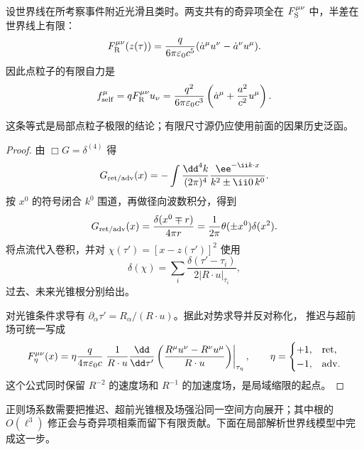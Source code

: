 \begin{proposition}[世界线上的正则场与有限自力]
设世界线在所考察事件附近光滑且类时。两支共有的奇异项全在 \(F_{\rm S}^{\mu\nu}\) 中，半差在世界线上有限：
\begin{equation}
 F_{\rm R}^{\mu\nu}(z(\tau))
 =\frac{q}{6\pi\varepsilon_0c^5}
 (\dot a^\mu u^\nu-\dot a^\nu u^\mu).
 \label{eq:phys-rr-regular-field-worldline}
\end{equation}
因此点粒子的有限自力是
\begin{equation}
 f_{\rm self}^\mu
 =qF_{\rm R}^{\mu\nu}u_\nu
 =\frac{q^2}{6\pi\varepsilon_0c^3}
 \left(\dot a^\mu+\frac{a^2}{c^2}u^\mu\right).
 \label{eq:phys-rr-ald-self-force}
\end{equation}
\end{proposition}
这条等式是局部点粒子极限的结论；有限尺寸源仍应使用前面的因果历史泛函。

\begin{proof}
由 \(\Box G=\delta^{(4)}\) 得
\[
 G_{\rm ret/adv}(x)
 =-\int\frac{\dd^4k}{(2\pi)^4}
 \frac{\ee^{-\ii k\cdot x}}{k^2\pm\ii0\,k^0}.
\]
按 \(x^0\) 的符号闭合 \(k^0\) 围道，再做径向波数积分，得到
\[
 G_{\rm ret/adv}(x)
 =\frac{\delta(x^0\mp r)}{4\pi r}
 =\frac1{2\pi}\theta(\pm x^0)\delta(x^2).
\]
将点流代入卷积，并对
\(\chi(\tau')=[x-z(\tau')]^2\) 使用
\[
 \delta(\chi)=\sum_i
 \frac{\delta(\tau'-\tau_i)}{2|R\cdot u|_{\tau_i}},
\]
过去、未来光锥根分别给出。

对光锥条件求导有
\(\partial_\alpha\tau'=R_\alpha/(R\cdot u)\)。据此对势求导并反对称化，
推迟与超前场可统一写成
\begin{equation}
 F_\eta^{\mu\nu}(x)
 =\eta\frac{q}{4\pi\varepsilon_0c}
 \left.
 \frac1{R\cdot u}\frac{\dd}{\dd\tau'}
 \left(\frac{R^\mu u^\nu-R^\nu u^\mu}{R\cdot u}\right)
 \right|_{\tau_\eta},
 \qquad \eta=\begin{cases}+1,&{\rm ret},\\-1,&{\rm adv}.
 \end{cases}
 \label{eq:phys-rr-unified-ret-adv-field}
\end{equation}
这个公式同时保留 \(R^{-2}\) 的速度场和 \(R^{-1}\) 的加速度场，是局域缩限的起点。
\end{proof}

正则场系数需要把推迟、超前光锥根及场强沿同一空间方向展开；其中根的 $O(\ell^3)$ 修正会与奇异项相乘而留下有限贡献。下面在局部解析世界线模型中完成这一步。


